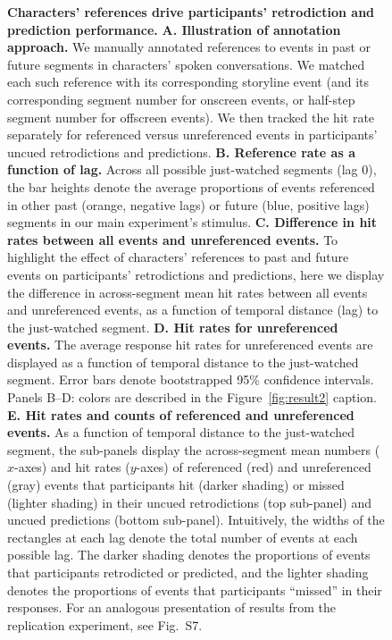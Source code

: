 \documentclass[10pt]{article}
\newcommand{\characterRefs}{S7}
\begin{document}
\begin{figure}[tp]
  \caption{\textbf{Characters' references drive participants' retrodiction and
  prediction performance.} \textbf{A. Illustration of annotation approach.} We
  manually annotated references to events in past or future segments in
  characters' spoken conversations. We matched each such reference with its
  corresponding storyline event (and its corresponding segment number for
  onscreen events, or half-step segment number for offscreen events). We then
  tracked the hit rate separately for referenced versus unreferenced events in
  participants' uncued retrodictions and predictions. \textbf{B. Reference rate
  as a function of lag.} Across all possible just-watched segments (lag 0), the
  bar heights denote the average proportions of events referenced in other past
  (orange, negative lags) or future (blue, positive lags) segments in our main
  experiment's stimulus. \textbf{C. Difference in hit rates between all events
  and unreferenced events.} To highlight the effect of characters' references
  to past and future events on participants' retrodictions and predictions,
  here we display the difference in across-segment mean hit rates between all
  events and unreferenced events, as a function of temporal distance (lag) to
  the just-watched segment. \textbf{D. Hit rates for unreferenced events.} The
  average response hit rates for unreferenced events are displayed as a
  function of temporal distance to the just-watched segment. Error bars denote
  bootstrapped 95\% confidence intervals. Panels B--D: colors are described in
  the Figure~\ref{fig:result2} caption. \textbf{E. Hit rates and counts of
  referenced and unreferenced events.} As a function of temporal distance to
  the just-watched segment, the sub-panels display the across-segment mean
  numbers ($x$-axes) and hit rates ($y$-axes) of referenced (red) and
  unreferenced (gray) events that participants hit (darker shading) or missed
  (lighter shading) in their uncued retrodictions (top sub-panel) and uncued
  predictions (bottom sub-panel). Intuitively, the widths of the rectangles at
  each lag denote the total number of events at each possible lag. The darker
  shading denotes the proportions of events that participants retrodicted or
  predicted, and the lighter shading denotes the proportions of events that
  participants ``missed'' in their responses. For an analogous presentation of
  results from the replication experiment, see Fig.~\characterRefs.}

  \label{fig:result3}
\end{figure}
\end{document}
